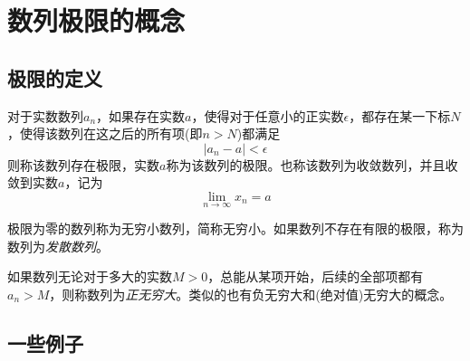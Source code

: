 
\section{数列极限的概念}
\label{sec:the-definition-of-sequence-limit}

\subsection{极限的定义}
\label{sec:definition-number-sequence-limit}

\begin{definition}
  对于实数数列${a_n}$，如果存在实数$a$，使得对于任意小的正实数$\epsilon$，都存在某一下标$N$，使得该数列在这之后的所有项(即$n>N$)都满足
  \begin{equation}
    \label{eq:the-definition-of-sequence-limit}
    |a_n-a|<\epsilon
  \end{equation}
  则称该数列存在极限，实数$a$称为该数列的极限。也称该数列为收敛数列，并且收敛到实数$a$，记为
  \begin{equation}
    \label{eq:limit-definition-for-number-sequence}
    \lim_{n \to \infty}x_n = a
  \end{equation}
\end{definition}

极限为零的数列称为无穷小数列，简称无穷小。如果数列不存在有限的极限，称为数列为\emph{发散数列}。

如果数列无论对于多大的实数$M>0$，总能从某项开始，后续的全部项都有$a_n>M$，则称数列为\emph{正无穷大}。类似的也有负无穷大和(绝对值)无穷大的概念。

\subsection{一些例子}
\label{sec:some-example-for-number-sequence}

